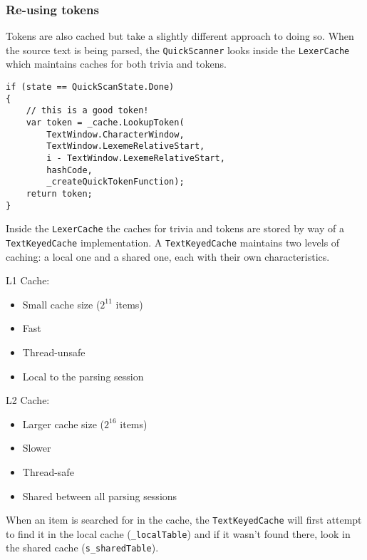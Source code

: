 \subsubsection{Re-using tokens}
\label{sec:re-use-tokens}

Tokens are also cached but take a slightly different approach to doing so. When the source text is being parsed, the \texttt{QuickScanner} looks inside the \texttt{LexerCache} which maintains caches for both trivia and tokens.

\begin{lstlisting}
if (state == QuickScanState.Done)
{
	// this is a good token!
	var token = _cache.LookupToken(
	    TextWindow.CharacterWindow,
	    TextWindow.LexemeRelativeStart,
	    i - TextWindow.LexemeRelativeStart,
	    hashCode,
	    _createQuickTokenFunction);
	return token;
}
\end{lstlisting}

Inside the \texttt{LexerCache} the caches for trivia and tokens are stored by way of a \texttt{TextKeyedCache} implementation. A \texttt{TextKeyedCache} maintains two levels of caching: a local one and a shared one, each with their own characteristics.

\noindent L1 Cache:

\begin{itemize}
\item Small cache size ($2^{11}$ items)
\item Fast
\item Thread-unsafe
\item Local to the parsing session
\end{itemize}

\noindent L2 Cache:

\begin{itemize}
\item Larger cache size ($2^{16}$ items)
\item Slower
\item Thread-safe
\item Shared between all parsing sessions
\end{itemize}

\noindent When an item is searched for in the cache, the \texttt{TextKeyedCache} will first attempt to find it in the local cache (\texttt{\_localTable}) and if it wasn't found there, look in the shared cache (\texttt{s\_sharedTable}).

